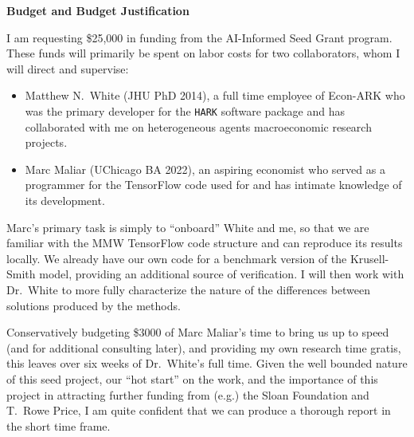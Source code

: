 \begin{center}
	\textbf{Budget and Budget Justification}
\end{center}

\noindent I am requesting \$25,000 in funding from the AI-Informed Seed Grant program. These funds will primarily be spent on labor costs for two collaborators, whom I will direct and supervise:
\begin{itemize}
	\item Matthew N.\ White (JHU PhD 2014), a full time employee of Econ-ARK who was the primary developer for the \texttt{HARK} software package and has collaborated with me on heterogeneous agents macroeconomic research projects. 
	
	\item Marc Maliar (UChicago BA 2022), an aspiring economist who served as a programmer for the TensorFlow code used for \cite{MALIAR202176} and has intimate knowledge of its development. 
\end{itemize}

\noindent Marc's primary task is simply to ``onboard'' White and me, so that we are familiar with the MMW TensorFlow code structure and can reproduce its results locally. We already have our own code for a benchmark version of the Krusell-Smith model, providing an additional source of verification. I will then work with Dr.\ White to more fully characterize the nature of the differences between solutions produced by the methods.

\vspace{0.2cm}

\noindent Conservatively budgeting \$3000 of Marc Maliar's time to bring us up to speed (and for additional consulting later), and providing my own research time gratis, this leaves over six weeks of Dr.\ White's full time. Given the well bounded nature of this seed project, our ``hot start'' on the work, and the importance of this project in attracting further funding from (e.g.) the Sloan Foundation and T.\ Rowe Price, I am quite confident that we can produce a thorough report in the short time frame.
